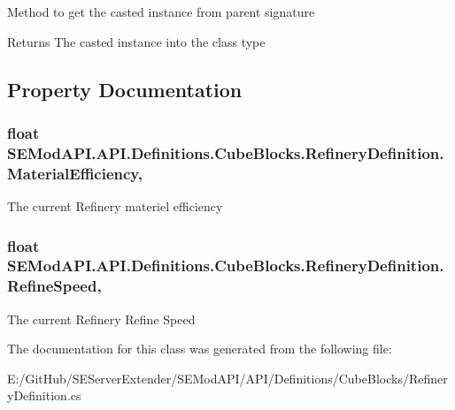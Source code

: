 Method to get the casted instance from parent signature 

\begin{DoxyReturn}{Returns}
The casted instance into the class type
\end{DoxyReturn}


\subsection{Property Documentation}
\hypertarget{class_s_e_mod_a_p_i_1_1_a_p_i_1_1_definitions_1_1_cube_blocks_1_1_refinery_definition_af1f398281e0658c2746fc81bc5275e6c}{}
\subsubsection[{Material\+Efficiency}]{\setlength{\rightskip}{0pt plus 5cm}float S\+E\+Mod\+A\+P\+I.\+A\+P\+I.\+Definitions.\+Cube\+Blocks.\+Refinery\+Definition.\+Material\+Efficiency\hspace{0.3cm}{\ttfamily [get]}, {\ttfamily [set]}}\label{class_s_e_mod_a_p_i_1_1_a_p_i_1_1_definitions_1_1_cube_blocks_1_1_refinery_definition_af1f398281e0658c2746fc81bc5275e6c}


The current Refinery materiel efficiency 

\hypertarget{class_s_e_mod_a_p_i_1_1_a_p_i_1_1_definitions_1_1_cube_blocks_1_1_refinery_definition_a2b78984b0f7fd0d880232969406af775}{}
\subsubsection[{Refine\+Speed}]{\setlength{\rightskip}{0pt plus 5cm}float S\+E\+Mod\+A\+P\+I.\+A\+P\+I.\+Definitions.\+Cube\+Blocks.\+Refinery\+Definition.\+Refine\+Speed\hspace{0.3cm}{\ttfamily [get]}, {\ttfamily [set]}}\label{class_s_e_mod_a_p_i_1_1_a_p_i_1_1_definitions_1_1_cube_blocks_1_1_refinery_definition_a2b78984b0f7fd0d880232969406af775}


The current Refinery Refine Speed 



The documentation for this class was generated from the following file\+:\begin{DoxyCompactItemize}
\item 
E\+:/\+Git\+Hub/\+S\+E\+Server\+Extender/\+S\+E\+Mod\+A\+P\+I/\+A\+P\+I/\+Definitions/\+Cube\+Blocks/Refinery\+Definition.\+cs\end{DoxyCompactItemize}
